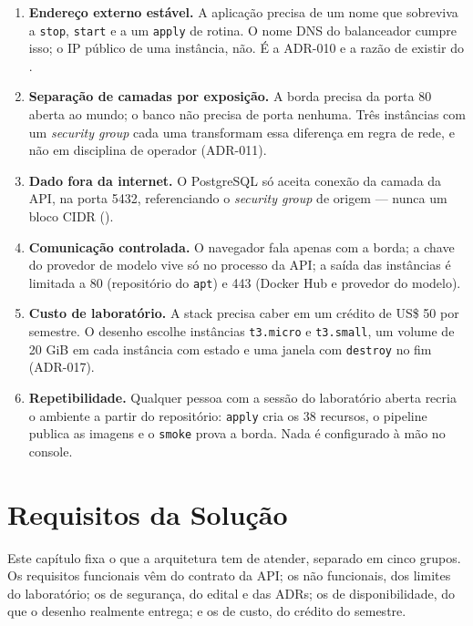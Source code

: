 \documentclass[11pt,a4paper]{article}
\begin{document}
\begin{enumerate}
  \item \textbf{Endereço externo estável.} A aplicação precisa de um nome que sobreviva a
        \texttt{stop}, \texttt{start} e a um \texttt{apply} de rotina. O nome DNS do balanceador
        cumpre isso; o IP público de uma instância, não. É a ADR-010 e a razão de existir do
        .
  \item \textbf{Separação de camadas por exposição.} A borda precisa da porta 80 aberta ao mundo; o
        banco não precisa de porta nenhuma. Três instâncias com um \emph{security group} cada uma
        transformam essa diferença em regra de rede, e não em disciplina de operador (ADR-011).
  \item \textbf{Dado fora da internet.} O PostgreSQL só aceita conexão da camada da API, na porta
        5432, referenciando o \emph{security group} de origem --- nunca um bloco CIDR
        ().
  \item \textbf{Comunicação controlada.} O navegador fala apenas com a borda; a chave do provedor
        de modelo vive só no processo da API; a saída das instâncias é limitada a 80 (repositório do
        \texttt{apt}) e 443 (Docker Hub e provedor do modelo).
  \item \textbf{Custo de laboratório.} A stack precisa caber em um crédito de US\$ 50 por semestre.
        O desenho escolhe instâncias \texttt{t3.micro} e \texttt{t3.small}, um volume de 20 GiB em cada
        instância com estado e uma janela com \texttt{destroy} no fim (ADR-017).
  \item \textbf{Repetibilidade.} Qualquer pessoa com a sessão do laboratório aberta recria o
        ambiente a partir do repositório: \texttt{apply} cria os 38 recursos, o pipeline publica as
        imagens e o \texttt{smoke} prova a borda. Nada é configurado à mão no console.
\end{enumerate}

\section{Requisitos da Solução}

Este capítulo fixa o que a arquitetura tem de atender, separado em cinco grupos. Os requisitos
funcionais vêm do contrato da API; os não funcionais, dos limites do laboratório; os de segurança,
do edital e das ADRs; os de disponibilidade, do que o desenho realmente entrega; e os de custo, do
crédito do semestre.
\end{document}
